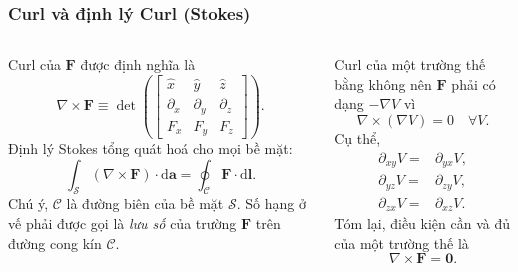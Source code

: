 \begin{frame}
    \frametitle{Curl và định lý Curl (Stokes)}
    \begin{columns}
        \begin{column}{0.5\textwidth}
            \scriptsize
            Curl của \(\mathbf{F}\) được định nghĩa là
            \[\nabla\times\mathbf{F}\equiv \det\left(\begin{bmatrix}
                \hat{x} & \hat{y} & \hat{z}\\
                \partial_x & \partial_y & \partial_z\\
                F_x & F_y & F_z
            \end{bmatrix}\right).\]
            Định lý Stokes tổng quát hoá cho mọi bề mặt:
            \begin{equation*}
                \int_{\mathcal{S}}(\nabla\times\mathbf{F})\cdot\text{d}\mathbf{a}=\oint_{\mathcal{C}}\mathbf{F}\cdot\text{d}\mathbf{l}.
            \end{equation*}
            Chú ý, \(\mathcal{C}\) là đường biên của bề mặt \(\mathcal{S}\). Số hạng ở vế phải được gọi là \emph{lưu số} của trường \(\mathbf{F}\) trên đường cong kín \(\mathcal{C}\).
        \end{column}
        \begin{column}{0.5\textwidth}
            \scriptsize
            Curl của một trường thế bằng không nên \(\mathbf{F}\) phải có dạng \(-\nabla V\) vì
            \[\nabla\times(\nabla V)=0 \quad\forall V.\]
            Cụ thể,
            \begin{align*}
                \partial_{xy}V=&\partial_{yx}V,\\
                \partial_{yz}V=&\partial_{zy}V,\\
                \partial_{zx}V=&\partial_{xz}V.   
            \end{align*}
            Tóm lại, điều kiện cần và đủ của một trường thế là \[\nabla\times \mathbf{F}=\mathbf{0}.\]
        \end{column}
    \end{columns}
\end{frame}

